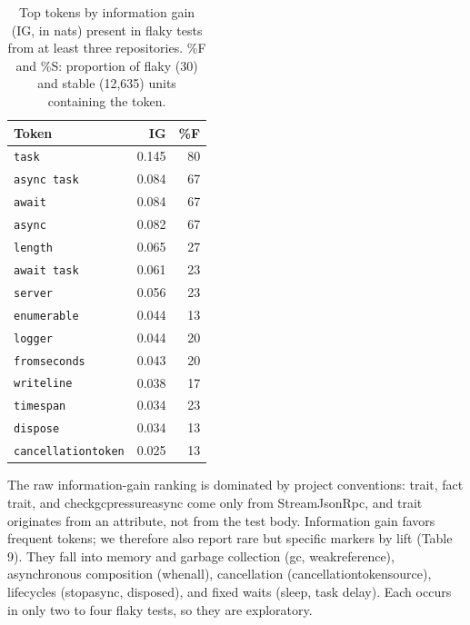 \begin{table}[!h]
\caption{Top tokens by information gain (IG, in nats) present in flaky tests from at least three repositories. \%F and \%S: proportion of flaky (30) and stable (12,635) units containing the token.}
\label{tab:tokens}
\centering
\footnotesize
\setlength{\tabcolsep}{12pt}
\begin{tabular}{@{}lrr@{}}
\hline\hline
\textbf{Token} & \textbf{IG} & \textbf{\%F} \\
\hline
\texttt{task}              & 0.145 & 80 \\
\texttt{async task}        & 0.084 & 67 \\
\texttt{await}             & 0.084 & 67 \\
\texttt{async}             & 0.082 & 67 \\
\texttt{length}            & 0.065 & 27 \\
\texttt{await task}        & 0.061 & 23 \\
\texttt{server}            & 0.056 & 23 \\
\texttt{enumerable}        & 0.044 & 13 \\
\texttt{logger}            & 0.044 & 20 \\
\texttt{fromseconds}       & 0.043 & 20 \\
\texttt{writeline}         & 0.038 & 17 \\
\texttt{timespan}          & 0.034 & 23 \\
\texttt{dispose}           & 0.034 & 13 \\
\texttt{cancellationtoken} & 0.025 & 13 \\
\hline\hline
\end{tabular}
\end{table}

The raw information-gain ranking is dominated by project conventions: trait, fact trait, and checkgcpressureasync come only from StreamJsonRpc, and trait originates from an attribute, not from the test body. Information gain favors frequent tokens; we therefore also report rare but specific markers by lift (Table 9). They fall into memory and garbage collection (gc, weakreference), asynchronous composition (whenall), cancellation (cancellationtokensource), lifecycles (stopasync, disposed), and fixed waits (sleep, task delay). Each occurs in only two to four flaky tests, so they are exploratory.

